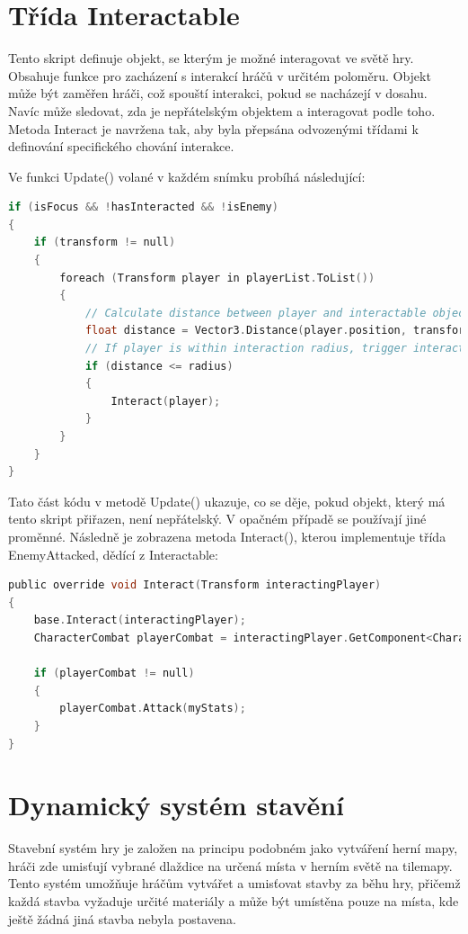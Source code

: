 \section{Třída Interactable}
Tento skript definuje objekt, se kterým je možné interagovat ve světě hry. Obsahuje funkce pro zacházení s interakcí hráčů v určitém poloměru. Objekt může být zaměřen hráči, což spouští interakci, pokud se nacházejí v dosahu. Navíc může sledovat, zda je nepřátelským objektem a interagovat podle toho. Metoda Interact je navržena tak, aby byla přepsána odvozenými třídami k definování specifického chování interakce.

Ve funkci Update() volané v každém snímku probíhá následující:

\begin{lstlisting}[language=C]
if (isFocus && !hasInteracted && !isEnemy)
{
	if (transform != null)
	{
		foreach (Transform player in playerList.ToList())
		{
			// Calculate distance between player and interactable object
			float distance = Vector3.Distance(player.position, transform.position);
			// If player is within interaction radius, trigger interaction
			if (distance <= radius)
			{
				Interact(player);
			}
		}
	}
}
\end{lstlisting}

Tato část kódu v metodě Update() ukazuje, co se děje, pokud objekt, který má tento skript přiřazen, není nepřátelský. V opačném případě se používají jiné proměnné. Následně je zobrazena metoda Interact(), kterou implementuje třída EnemyAttacked, dědící z Interactable:

\begin{lstlisting}[language=C]
public override void Interact(Transform interactingPlayer)
{
	base.Interact(interactingPlayer);
	CharacterCombat playerCombat = interactingPlayer.GetComponent<CharacterCombat>();
	
	if (playerCombat != null)
	{
		playerCombat.Attack(myStats);
	}
}
\end{lstlisting}

\section{Dynamický systém stavění}
\label{buildingSystem}
Stavební systém hry je založen na principu podobném jako vytváření herní mapy, hráči zde umisťují vybrané dlaždice na určená místa v herním světě na tilemapy. Tento systém umožňuje hráčům vytvářet a umisťovat stavby za běhu hry, přičemž každá stavba vyžaduje určité materiály a může být umístěna pouze na místa, kde ještě žádná jiná stavba nebyla postavena.

